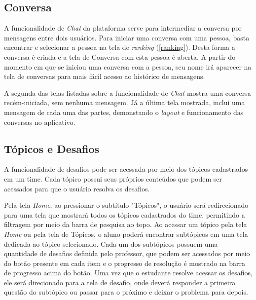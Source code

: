\subsection{Conversa}

A funcionalidade de \textit{Chat} da plataforma serve para intermediar a conversa por mensagens entre dois usuários. Para iniciar uma conversa com uma pessoa, basta encontrar e selecionar a pessoa na tela de \textit{ranking} (\ref{ranking}). Desta forma a conversa é criada e a tela de Conversa com esta pessoa é aberta. A partir do momento em que se iniciou uma conversa com a pessoa, seu nome irá aparecer na tela de conversas para mais fácil acesso ao histórico de mensagens.


A segunda das telas listadas sobre a funcionalidade de \textit{Chat} mostra uma conversa recém-iniciada, sem nenhuma mensagem. Já a última tela mostrada, inclui uma mensagem de cada uma das partes, demonstando o \textit{layout} e funcionamento das conversas no aplicativo.

\subsection{Tópicos e Desafios}
\label{topics_challenges}

A funcionalidade de desafios pode ser acessada por meio dos tópicos cadastrados em um time. Cada tópico possui seus próprios conteúdos que podem ser acessados para que o usuário resolva os desafios.


Pela tela \textit{Home}, ao pressionar o subtítulo "Tópicos", o usuário será redirecionado para uma tela que mostrará todos os tópicos cadastrados do time, permitindo a filtragem por meio da barra de pesquisa ao topo. Ao acessar um tópico pela tela \textit{Home} ou pela tela de Tópicos, o aluno poderá encontrar subtópicos em uma tela dedicada ao tópico selecionado. Cada um dos subtópicos possuem uma quantidade de desafios definida pelo professor, que podem ser acessados por meio do botão presente em cada item e o progresso de resolução é mostrado na barra de progresso acima do botão. Uma vez que o estudante resolve acessar os desafios, ele será direcionado para a tela de desafio, onde deverá responder a primeira questão do subtópico ou passar para o próximo e deixar o problema para depois.

